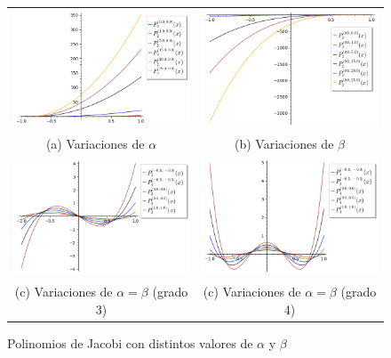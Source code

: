\begin{figure}[h]
    \centering
    \begin{tabular}{cc}
        \includegraphics[width=7cm]{img/C2/Jacobi1.png} & 
        \includegraphics[width=7cm]{img/C2/Jacobi2.png} \\
        (a) Variaciones de $\alpha$ & (b) Variaciones de $\beta$ \\

        \includegraphics[width=7cm]{img/C2/Jacobi3.png} & \includegraphics[width=7cm]{img/C2/Jacobi4.png} \\
        (c) Variaciones de $\alpha=\beta$ (grado 3) & (c) Variaciones de $\alpha=\beta$ (grado 4)
    \end{tabular}
    \caption{Polinomios de Jacobi con distintos valores de $\alpha$ y $\beta$}
    \label{img:graficas-Jacobi-alpha-beta}
\end{figure}


